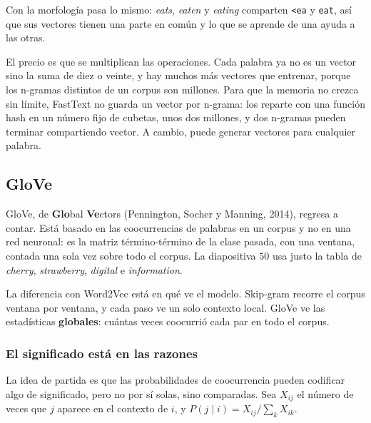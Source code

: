 \documentclass[11pt,letterpaper]{article}
\begin{document}
Con la morfología pasa lo mismo: \textit{eats}, \textit{eaten} y
\textit{eating} comparten \texttt{<ea} y \texttt{eat}, así que sus
vectores tienen una parte en común y lo que se aprende de una ayuda a
las otras.

\begin{ojo}
    El precio es que se multiplican las operaciones. Cada palabra ya
    no es un vector sino la suma de diez o veinte, y hay muchos más
    vectores que entrenar, porque los n-gramas distintos de un corpus
    son millones. Para que la memoria no crezca sin límite, FastText no
    guarda un vector por n-grama: los reparte con una función hash en
    un número fijo de cubetas, unos dos millones, y dos n-gramas pueden
    terminar compartiendo vector. A cambio, puede generar vectores para
    cualquier palabra.
\end{ojo}


\subsection*{GloVe}

GloVe, de \textbf{Glo}bal \textbf{Ve}ctors (Pennington, Socher y
Manning, 2014), regresa a contar. Está basado en las coocurrencias de
palabras en un corpus y no en una red neuronal: es la matriz
término-término de la clase pasada, con una ventana, contada una sola
vez sobre todo el corpus. La diapositiva $50$ usa justo la tabla de
\textit{cherry}, \textit{strawberry}, \textit{digital} e
\textit{information}.

La diferencia con Word2Vec está en qué ve el modelo. Skip-gram recorre
el corpus ventana por ventana, y cada paso ve un solo contexto local.
GloVe ve las estadísticas \textbf{globales}: cuántas veces coocurrió
cada par en todo el corpus.

\subsubsection*{El significado está en las razones}

La idea de partida es que las probabilidades de coocurrencia pueden
codificar algo de significado, pero no por sí solas, sino comparadas.
Sea $X_{ij}$ el número de veces que $j$ aparece en el contexto de $i$,
y $P(j \mid i) = X_{ij} / \sum_k X_{ik}$.
\end{document}
